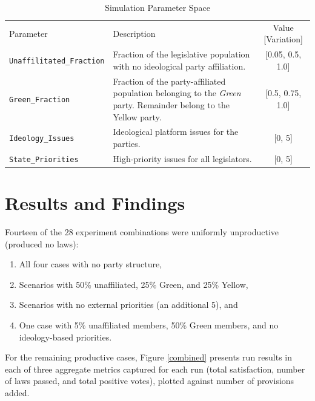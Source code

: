 \documentclass[pdftex,12pt,oribibl]{llncs}
\begin{document}
\begin{table}
 \caption{Simulation Parameter Space}
 \begin{tabular}{lp{2.25in}c}
 \hline\noalign{\smallskip}
 Parameter & Description & Value [Variation] \\
 \noalign{\smallskip}
 \hline
 \noalign{\smallskip}
 \texttt{Unaffilitated\_Fraction} & Fraction of the legislative population with no ideological party  affiliation. & [0.05, 0.5, 1.0] \\
 \texttt{Green\_Fraction} & Fraction of the party-affiliated population belonging to the \textit{Green} party. Remainder belong to the Yellow party. & [0.5, 0.75, 1.0] \\
 \texttt{Ideology\_Issues} & Ideological platform issues for the parties. & [0, 5] \\
 \texttt{State\_Priorities} & High-priority issues for all legislators. & [0, 5] \\
 \hline
 \end{tabular}
 \label{params}
\end{table}


\section{Results and Findings}
%
Fourteen of the 28 experiment combinations were uniformly unproductive (produced no laws):
\begin{enumerate}
\item All four cases with no party structure,
\item Scenarios with 50\% unaffiliated, 25\% Green, and 25\% Yellow,
\item Scenarios with no external priorities (an additional 5), and
\item One case with 5\% unaffiliated members, 50\% Green members, and no ideology-based priorities.
\end{enumerate}
For the remaining productive cases, Figure \ref{combined} presents run results in each of three aggregate metrics captured for each run (total satisfaction, number of laws passed, and total positive votes), plotted against number of provisions added. 
\end{document}
